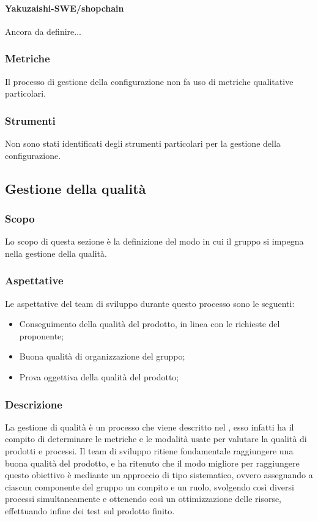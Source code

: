         \paragraph{Yakuzaishi-SWE/shopchain}
        Ancora da definire...



    \subsubsection{Metriche}
    Il processo di gestione della configurazione non fa uso di metriche qualitative particolari.
    
    \subsubsection{Strumenti}
    Non sono stati identificati degli strumenti particolari per la gestione della configurazione.

\pagebreak

\subsection{Gestione della qualità}\label{subsection: gestione_qualita}
\subsubsection{Scopo}
Lo scopo di questa sezione è la definizione del modo in cui il gruppo si impegna nella gestione della qualità.
\subsubsection{Aspettative}
Le aspettative del team di sviluppo durante questo processo sono le seguenti:
\begin {itemize}
    \item Conseguimento della qualità del prodotto, in linea con le richieste del proponente;
    \item Buona qualità di organizzazione del gruppo;
    \item Prova oggettiva della qualità del prodotto;
\end {itemize}
\subsubsection{Descrizione}
La gestione di qualità è un processo che viene descritto nel \docNamePdQLow, esso infatti ha il compito di determinare le metriche e le modalità usate per valutare la qualità di prodotti e processi.
Il team di sviluppo ritiene fondamentale raggiungere una buona qualità del prodotto, e ha ritenuto che il modo migliore per raggiungere questo obiettivo è mediante un approccio di tipo sistematico, ovvero assegnando a ciascun componente del gruppo un compito e un ruolo, svolgendo così diversi processi simultaneamente e ottenendo così un ottimizzazione delle risorse, effettuando infine dei test sul prodotto finito. 
